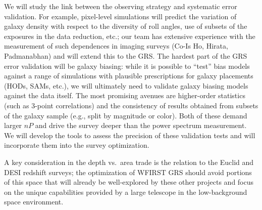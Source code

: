 {We will study the link between the observing strategy and systematic error
validation.  For example, pixel-level simulations will predict the variation of
galaxy density with respect to the diversity of roll angles, use of subsets of
the exposures in the data reduction, etc.; our team has extensive experience
with the measurement of such dependences in imaging surveys (Co-Is Ho, Hirata,
Padmanabhan)
and will extend this to the GRS. The hardest part of the GRS error
validation will be galaxy biasing: while it is possible to ``test'' bias models
against a range of simulations with plausible prescriptions for galaxy
placements (HODs, SAMs, etc.), we will ultimately need to validate galaxy
biasing models against the data itself. The most promising avenues are
higher-order statistics (such as 3-point correlations) 
and the consistency of results obtained from subsets of the galaxy sample 
(e.g., split by magnitude or color).
Both of these demand larger $nP$ and drive
the survey deeper than the power spectrum measurement.
We will develop the tools to assess the precision of these
validation tests and will incorporate them into the survey optimization.

A key consideration in the depth vs.\ area trade is the relation to the Euclid
and DESI redshift surveys; the optimization of WFIRST GRS should avoid portions
of this space that will already be well-explored by these other projects and
focus on the unique capabilities provided by a large telescope in the
low-background space environment.

}
